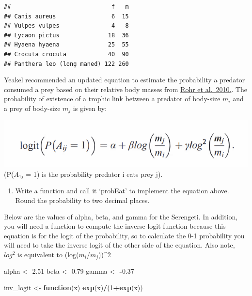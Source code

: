 \documentclass[
]{article}
\newenvironment{Shaded}{\begin{snugshade}}{\end{snugshade}}
\newcommand{\ControlFlowTok}[1]{\textcolor[rgb]{0.13,0.29,0.53}{\textbf{#1}}}
\newcommand{\DecValTok}[1]{\textcolor[rgb]{0.00,0.00,0.81}{#1}}
\newcommand{\FloatTok}[1]{\textcolor[rgb]{0.00,0.00,0.81}{#1}}
\newcommand{\FunctionTok}[1]{\textcolor[rgb]{0.13,0.29,0.53}{\textbf{#1}}}
\newcommand{\NormalTok}[1]{#1}
\newcommand{\OtherTok}[1]{\textcolor[rgb]{0.56,0.35,0.01}{#1}}
\newcommand{\SpecialCharTok}[1]{\textcolor[rgb]{0.81,0.36,0.00}{\textbf{#1}}}
\providecommand{\tightlist}{%
  \setlength{\itemsep}{0pt}\setlength{\parskip}{0pt}}
\begin{document}
\begin{verbatim}
##                             f   m
## Canis aureus                6  15
## Vulpes vulpes               4   8
## Lycaon pictus              18  36
## Hyaena hyaena              25  55
## Crocuta crocuta            40  90
## Panthera leo (long maned) 122 260
\end{verbatim}

Yeakel recommended an updated equation to estimate the probability a
predator consumed a prey based on their relative body masses from
\href{https://doi.org/10.1086/653667}{Rohr et al.~2010.}. The
probability of existence of a trophic link between a predator of
body-size \(m_i\) and a prey of body-size \(m_j\) is given by:

\includegraphics{figures/feeding_equ.png} (P(\(A_{1j}\) = 1) is the
probability predator i eats prey j).

\begin{enumerate}
\def\labelenumi{\alph{enumi}.}
\tightlist
\item
  Write a function and call it `probEat' to implement the equation
  above. Round the probability to two decimal places.
\end{enumerate}

Below are the values of alpha, beta, and gamma for the Serengeti. In
addition, you will need a function to compute the inverse logit function
because this equation is for the logit of the probability, so to
calculate the 0-1 probability you will need to take the inverse logit of
the other side of the equation. Also note, \(log^2\) is equivalent to
(log(\(m_i\)/\(m_j\)))\^{}2

\begin{Shaded}
\begin{Highlighting}[]
\NormalTok{alpha }\OtherTok{\textless{}{-}} \FloatTok{2.51}
\NormalTok{beta }\OtherTok{\textless{}{-}} \FloatTok{0.79}
\NormalTok{gamma }\OtherTok{\textless{}{-}} \SpecialCharTok{{-}}\FloatTok{0.37}
  
\NormalTok{inv\_logit }\OtherTok{\textless{}{-}} \ControlFlowTok{function}\NormalTok{(x) }\FunctionTok{exp}\NormalTok{(x)}\SpecialCharTok{/}\NormalTok{(}\DecValTok{1}\SpecialCharTok{+}\FunctionTok{exp}\NormalTok{(x))}
\end{Highlighting}
\end{Shaded}
\end{document}
